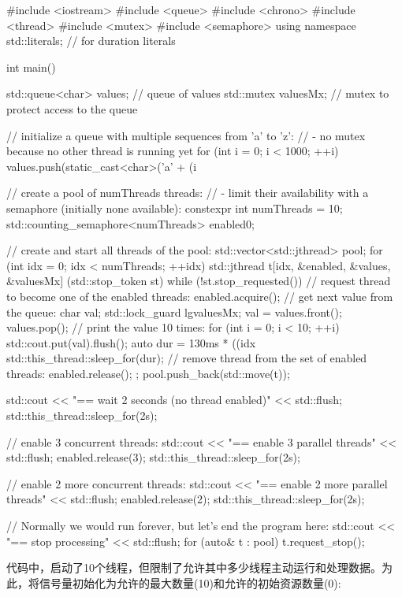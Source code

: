 \begin{cpp}
#include <iostream>
#include <queue>
#include <chrono>
#include <thread>
#include <mutex>
#include <semaphore>
using namespace std::literals; // for duration literals

int main()
{
	std::queue<char> values; // queue of values
	std::mutex valuesMx; // mutex to protect access to the queue
	
	// initialize a queue with multiple sequences from ’a’ to ’z’:
	// - no mutex because no other thread is running yet
	for (int i = 0; i < 1000; ++i) {
		values.push(static_cast<char>('a' + (i %
	}
	
	// create a pool of numThreads threads:
	// - limit their availability with a semaphore (initially none available):
	constexpr int numThreads = 10;
	std::counting_semaphore<numThreads> enabled{0};
	
	// create and start all threads of the pool:
	std::vector<std::jthread> pool;
	for (int idx = 0; idx < numThreads; ++idx) {
		std::jthread t{[idx, &enabled, &values, &valuesMx] (std::stop_token st) {
				while (!st.stop_requested()) {
					// request thread to become one of the enabled threads:
					enabled.acquire();
					// get next value from the queue:
					char val;
					{
						std::lock_guard lg{valuesMx};
						val = values.front();
						values.pop();
					}
					// print the value 10 times:
					for (int i = 0; i < 10; ++i) {
						std::cout.put(val).flush();
						auto dur = 130ms * ((idx %
						std::this_thread::sleep_for(dur);
					}
					// remove thread from the set of enabled threads:
					enabled.release();
					}
				}};
		pool.push_back(std::move(t));
	}
	
	std::cout << "== wait 2 seconds (no thread enabled)\n" << std::flush;
	std::this_thread::sleep_for(2s);
	
	// enable 3 concurrent threads:
	std::cout << "== enable 3 parallel threads\n" << std::flush;
	enabled.release(3);
	std::this_thread::sleep_for(2s);
	
	// enable 2 more concurrent threads:
	std::cout << "\n== enable 2 more parallel threads\n" << std::flush;
	enabled.release(2);
	std::this_thread::sleep_for(2s);
	
	// Normally we would run forever, but let’s end the program here:
	std::cout << "\n== stop processing\n" << std::flush;
	for (auto& t : pool) {
	t.request_stop();
	}
}
\end{cpp}

代码中，启动了10个线程，但限制了允许其中多少线程主动运行和处理数据。为此，将信号量初始化为允许的最大数量(10)和允许的初始资源数量(0):

